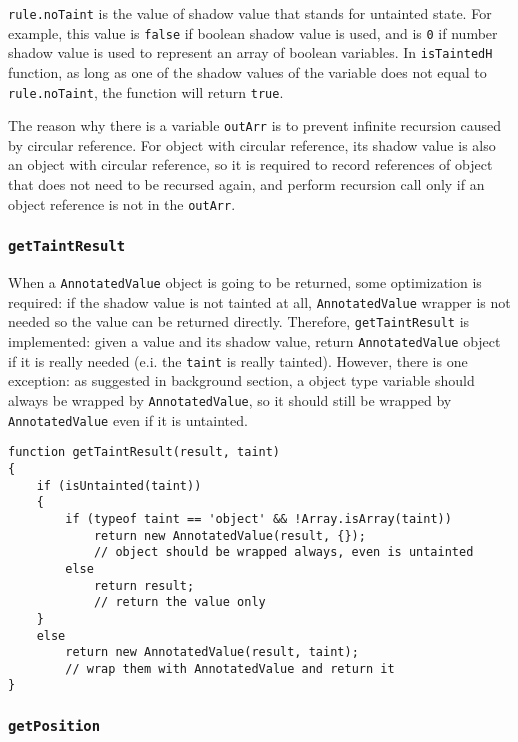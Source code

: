 \texttt{rule.noTaint} is the value of shadow value that stands for untainted state. For example, this value is \texttt{false} if boolean shadow value is used, and is \texttt{0} if number shadow value is used to represent an array of boolean variables. In \texttt{isTaintedH} function, as long as one of the shadow values of the variable does not equal to \texttt{rule.noTaint}, the function will return \texttt{true}.

The reason why there is a variable \texttt{outArr} is to prevent infinite recursion caused by circular reference. For object with circular reference, its shadow value is also an object with circular reference, so it is required to record references of object that does not need to be recursed again, and perform recursion call only if an object reference is not in the \texttt{outArr}.

\subsubsection{\texttt{getTaintResult}}

When a \texttt{AnnotatedValue} object is going to be returned, some optimization is required: if the shadow value is not tainted at all, \texttt{AnnotatedValue} wrapper is not needed so the value can be returned directly. Therefore, \texttt{getTaintResult} is implemented: given a value and its shadow value, return \texttt{AnnotatedValue} object if it is really needed (e.i. the \texttt{taint} is really tainted). However, there is one exception: as suggested in background section, a object type variable should always be wrapped by \texttt{AnnotatedValue}, so it should still be wrapped by \texttt{AnnotatedValue} even if it is untainted.

\begin{verbatim}
function getTaintResult(result, taint)
{
    if (isUntainted(taint))
    {
        if (typeof taint == 'object' && !Array.isArray(taint))
            return new AnnotatedValue(result, {}); 
            // object should be wrapped always, even is untainted
        else
            return result;
            // return the value only
    }
    else
        return new AnnotatedValue(result, taint);
        // wrap them with AnnotatedValue and return it
}
\end{verbatim}

\subsubsection{\texttt{getPosition}}

